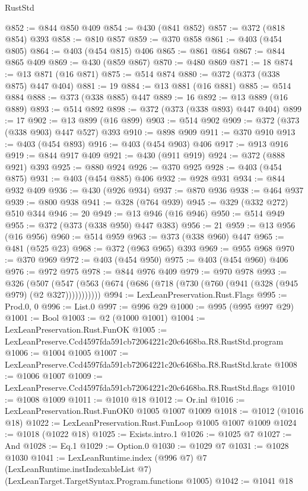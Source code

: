 \begin{lexlean}{RustStd}
\begin{coremodule}
@852 := @844 @850 @409
@854 := @430 (@841 @852)
@857 := @372 (@818 @854) @393
@858 := @810 @857
@859 := @370 @858
@861 := @403 (@454 @805)
@864 := @403 (@454 @815) @406
@865 := @861 @864
@867 := @844 @865 @409
@869 := @430 (@859 @867)
@870 := @480 @869
@871 := 18
@874 := @13 @871 (@16 @871)
@875 := @514 @874
@880 := @372 (@373 (@338 @875) @447 @404)
@881 := 19
@884 := @13 @881 (@16 @881)
@885 := @514 @884
@888 := @373 (@338 @885) @447
@889 := 16
@892 := @13 @889 (@16 @889)
@893 := @514 @892
@898 := @372 (@373 (@338 @893) @447 @404)
@899 := 17
@902 := @13 @899 (@16 @899)
@903 := @514 @902
@909 := @372 (@373 (@338 @903) @447 @527) @393
@910 := @898 @909
@911 := @370 @910
@913 := @403 (@454 @893)
@916 := @403 (@454 @903) @406
@917 := @913 @916
@919 := @844 @917 @409
@921 := @430 (@911 @919)
@924 := @372 (@888 @921) @393
@925 := @880 @924
@926 := @370 @925
@928 := @403 (@454 @875)
@931 := @403 (@454 @885) @406
@932 := @928 @931
@934 := @844 @932 @409
@936 := @430 (@926 @934)
@937 := @870 @936
@938 := @464 @937
@939 := @800 @938
@941 := @328 (@764 @939)
@945 := @329 (@332 @272) @510 @344
@946 := 20
@949 := @13 @946 (@16 @946)
@950 := @514 @949
@955 := @372 (@373 (@338 @950) @447 @383)
@956 := 21
@959 := @13 @956 (@16 @956)
@960 := @514 @959
@963 := @373 (@338 @960) @447
@965 := @481 (@525 @23)
@968 := @372 (@963 @965) @393
@969 := @955 @968
@970 := @370 @969
@972 := @403 (@454 @950)
@975 := @403 (@454 @960) @406
@976 := @972 @975
@978 := @844 @976 @409
@979 := @970 @978
@993 := @326
    (@507 (@547 (@563 (@674 (@686 (@718 (@730 (@760 (@941 (@328 (@945 @979) (@2 @327)))))))))))
@994 := LexLeanPreservation.Rust.Flags
@995 := Prod.{0, 0}
@996 := List.{0}
@997 := @996 @29
@1000 := @995 (@995 @997 @29)
@1001 := Bool
@1003 := @2 (@1000 @1001)
@1004 := LexLeanPreservation.Rust.FunOK
@1005 := LexLeanPreserve.Ccd4597fda591cb72064221c20c6468ba.R8.RustStd.program
@1006 := @1004 @1005
@1007 := LexLeanPreserve.Ccd4597fda591cb72064221c20c6468ba.R8.RustStd.krate
@1008 := @1006 @1007
@1009 := LexLeanPreserve.Ccd4597fda591cb72064221c20c6468ba.R8.RustStd.flags
@1010 := @1008 @1009
@1011 := @1010 @18
@1012 := Or.inl
@1016 := LexLeanPreservation.Rust.FunOK0 @1005 @1007 @1009
@1018 := @1012 (@1016 @18)
@1022 := LexLeanPreservation.Rust.FunLoop @1005 @1007 @1009
@1024 := @1018 (@1022 @18)
@1025 := Exists.intro.{1}
@1026 := @1025 @7
@1027 := And
@1028 := Eq.{1}
@1029 := Option.{0}
@1030 := @1029 @7
@1031 := @1028 @1030
@1041 := LexLeanRuntime.index
    (@996 @7)
    @7
    (LexLeanRuntime.instIndexableList @7)
    (LexLeanTarget.TargetSyntax.Program.functions @1005)
@1042 := @1041 @18

\end{coremodule}
\end{lexlean}
